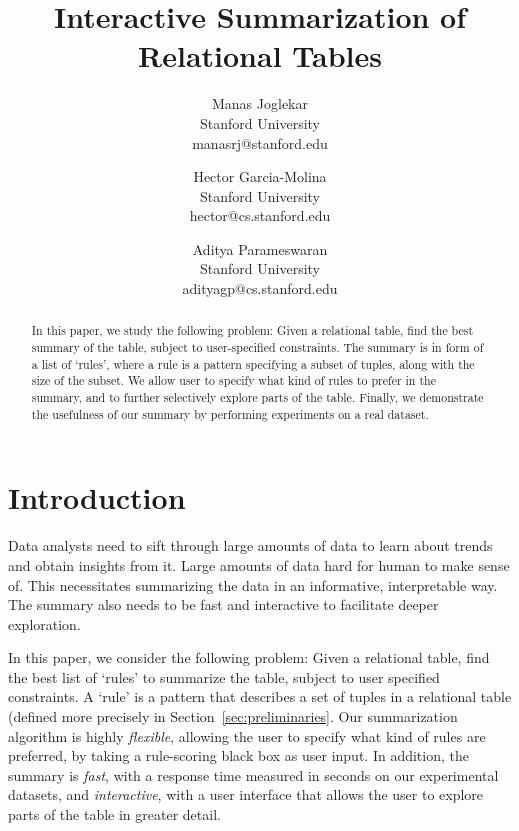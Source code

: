 \documentclass{sig-alternate}
\title{Interactive Summarization of Relational Tables}
\author{
Manas Joglekar\\Stanford University\\manasrj@stanford.edu
\and
Hector Garcia-Molina\\Stanford University\\hector@cs.stanford.edu
\and
Aditya Parameswaran\\Stanford University\\adityagp@cs.stanford.edu
}
\begin{document}
\maketitle

\begin{abstract}
In this paper, we study the following problem: Given a relational table, find the best summary of the table, subject to user-specified constraints. The summary is in form of a list of `rules', where a rule is a pattern specifying a subset of tuples, along with the size of the subset. We allow user to specify what kind of rules to prefer in the summary, and to further selectively explore parts of the table. Finally, we demonstrate the usefulness of our summary by performing experiments on a real dataset.
\end{abstract}

\section{Introduction}

Data analysts need to sift through large amounts of data to learn about trends and obtain insights from it. Large amounts of data hard for human to make sense of. This necessitates summarizing the data in an informative, interpretable way. The summary also needs to be fast and interactive to facilitate deeper exploration.

In this paper, we consider the following problem: Given a relational table, find the best list of `rules' to summarize the table, subject to user specified constraints. A `rule' is a pattern that describes a set of tuples in a relational table (defined more precisely in Section~\ref{sec:preliminaries}. Our summarization algorithm is highly {\em flexible}, allowing the user to specify what kind of rules are preferred, by taking a rule-scoring black box as user input. In addition, the summary is {\em fast}, with a response time measured in seconds on our experimental datasets, and {\em interactive}, with a user interface that allows the user to explore parts of the table in greater detail. 
\end{document}
